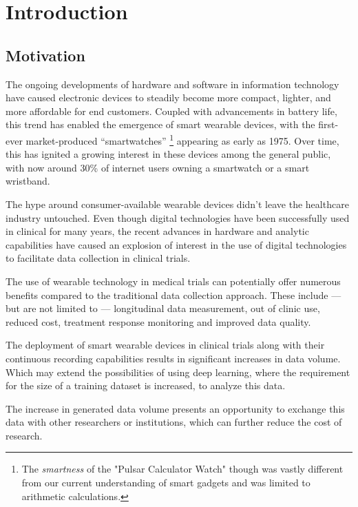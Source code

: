 \chapter{Introduction}\label{ch:introduction}

\section{Motivation}\label{sec:motivation}

The ongoing developments of hardware and software in information technology have caused electronic devices to steadily become more compact, lighter,
and more affordable for end customers.
Coupled with advancements in battery life, this trend has enabled the emergence of smart wearable devices,
with the first-ever market-produced ``smartwatches''
\footnote{The \textit{smartness} of the "Pulsar Calculator Watch" though was vastly different from our current
understanding of smart gadgets and was limited to arithmetic calculations.} appearing as early as 1975\cite{ometov_survey_2021}.
Over time, this has ignited a growing interest in these devices among the general public, with now around
30\%\cite{simon_kemp_rise_2023} of internet users owning a smartwatch or a smart wristband.

The hype around consumer-available wearable devices didn't leave the healthcare industry untouched.
Even though digital technologies have been successfully used in clinical for many years, the recent advances in
hardware and analytic capabilities have caused an explosion of interest in the use of digital technologies to
facilitate data collection in clinical trials\cite{clay_impact_2017}.

The use of wearable technology in medical trials can potentially offer numerous benefits compared to the
traditional data collection approach.
These include --- but are not limited to --- longitudinal data measurement, out of clinic use, reduced cost, treatment response monitoring and improved data quality\cite{munos_mobile_2016}.

The deployment of smart wearable devices in clinical trials along with their continuous recording capabilities results in significant increases in data volume\cite{munos_mobile_2016}.
Which may extend the possibilities of using deep learning, where the requirement for the size of a training dataset is increased, to analyze this data.

The increase in generated data volume presents an opportunity to exchange this data with other researchers or institutions, which can further reduce the cost of research.

